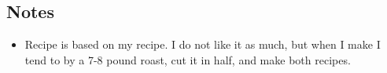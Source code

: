 \begin{multicols}{2}
\subsection*{Notes}
\begin{itemize}
    \item Recipe is based on my  recipe. I do not like it as much, but when I make  I tend to by a 7-8 pound roast, cut it in half, and make both recipes.
\end{itemize}
\end{multicols}
\clearpage